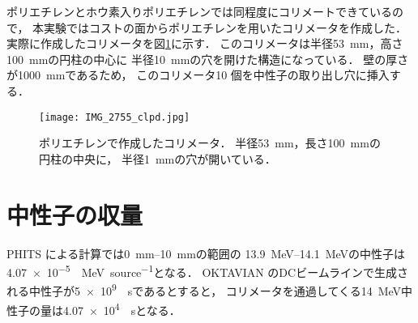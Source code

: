 \documentclass[../master]{subfiles}
\begin{document}
ポリエチレンとホウ素入りポリエチレンでは同程度にコリメートできているので，
本実験ではコストの面からポリエチレンを用いたコリメータを作成した．
実際に作成したコリメータを図\ref{pic::collimator}に示す．
このコリメータは半径\SI{53}{\milli\metre}，高さ\SI{100}{\milli\metre}の円柱の中心に
半径\SI{10}{\milli\metre}の穴を開けた構造になっている．
壁の厚さが\SI{1000}{\milli\metre}であるため，
このコリメータ10 個を中性子の取り出し穴に挿入する．
\begin{figure}
  \centering
  \texttt{[image: IMG\_2755\_clpd.jpg]}
  \caption[ポリエチレンで作成したコリメータ．]
          {ポリエチレンで作成したコリメータ．
            半径\SI{53}{\milli\metre}，長さ\SI{100}{\milli\metre}の円柱の中央に，
          半径\SI{1}{\milli\metre}の穴が開いている．}
  \label{pic::collimator}
\end{figure}

\section{中性子の収量}
PHITS による計算では\SIrange{0}{10}{\milli\metre}の範囲の
\SIrange{13.9}{14.1}{\mega\electronvolt}の中性子は
\SI{4.07e-5}{\per\mega\electronvolt\per source}となる．
OKTAVIAN のDCビームラインで生成される中性子が\SI{5e9}{\per\second}であるとすると，
コリメータを通過してくる\SI{14}{\mega\electronvolt}中性子の量は\SI{4.07e4}{\per\second}となる．
\end{document}
